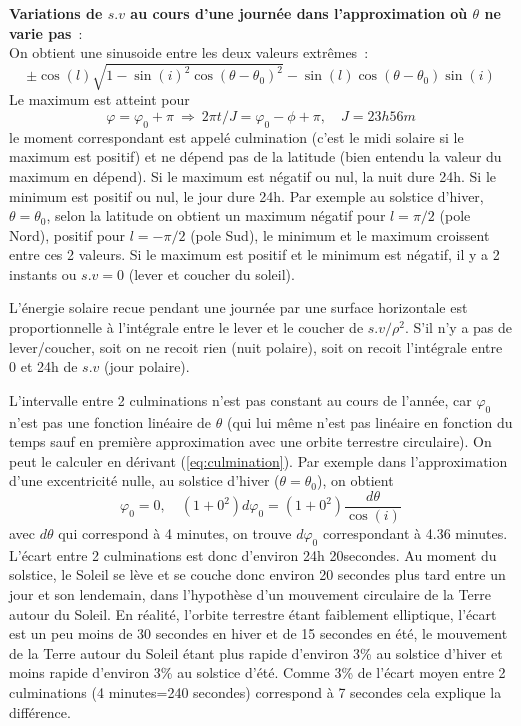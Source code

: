 \documentclass[a4paper,11pt]{article}
\begin{document}
{\bf Variations de $s.v$ au cours d'une journ\'ee dans l'approximation o\`u
$\theta$ ne varie pas}~:\\
On obtient une sinusoide entre les deux valeurs extr\^emes~:
\[ \pm \cos(l) \sqrt{1 - \sin(i)^2 \cos(\theta-\theta_0)^2 } -
 \sin(l) \cos(\theta-\theta_0)\sin(i) \]
Le maximum est atteint pour 
\[ \varphi=\varphi_0+ \pi \ \Rightarrow \ 
2 \pi t/J = \varphi_0 - \phi + \pi, \quad J=23h56m \]
le moment correspondant est appel\'e culmination (c'est le midi
solaire si le maximum est positif) et ne d\'epend pas de la latitude
(bien entendu la valeur du maximum en d\'epend).
Si le maximum est n\'egatif ou nul, la nuit dure 24h.
Si le minimum est positif ou nul, le jour dure 24h.
Par exemple au solstice d'hiver, $\theta=\theta_0$, selon la latitude
on obtient un maximum n\'egatif pour $l=\pi/2$ (pole Nord), positif 
pour $l=-\pi/2$ (pole Sud), le minimum et le maximum croissent 
entre ces 2 valeurs.
Si le maximum est positif et le minimum est n\'egatif, il y a
2 instants ou $s.v=0$ (lever et coucher du soleil).

L'\'energie solaire recue pendant une journ\'ee par une surface
horizontale est proportionnelle \`a l'int\'egrale entre le lever
et le coucher de $s.v/\rho^2$. S'il n'y a pas de lever/coucher, 
soit on ne recoit rien (nuit polaire),
soit on recoit l'int\'egrale entre 0 et 24h de $s.v$ (jour polaire).

L'intervalle entre 2 culminations n'est pas constant au cours de
l'ann\'ee, car $\varphi_0$ n'est pas une fonction lin\'eaire de
$\theta$ (qui lui m\^eme n'est pas lin\'eaire en fonction du temps
sauf en premi\`ere approximation avec une orbite terrestre
circulaire). On peut le calculer en d\'erivant (\ref{eq:culmination}).
Par exemple dans l'approximation d'une excentricit\'e nulle,
au solstice d'hiver ($\theta=\theta_0$), on obtient
\[ \varphi_0= 0, \quad (1+0^2) d\varphi_0 = (1+0^2)\frac{d\theta} {\cos(i)} \]
avec $d\theta$ qui correspond \`a 4 minutes, on trouve $d\varphi_0$
correspondant \`a 4.36 minutes.
L'\'ecart entre 2 culminations
est donc d'environ 24h 20secondes. 
Au moment du solstice, le Soleil se l\`eve et se couche donc environ
20 secondes plus tard entre un jour et son lendemain, dans 
l'hypothèse d'un mouvement circulaire de la Terre autour du Soleil. 
En réalité, l'orbite terrestre étant faiblement elliptique,
l'écart est un peu moins de 30 secondes en hiver et de 15 secondes en été, 
le mouvement de la Terre autour du Soleil étant plus rapide d'environ
3\% au solstice d'hiver et moins rapide d'environ 3\% au
solstice d'été. Comme 3\%
de l'écart moyen entre 2 culminations (4 minutes=240 secondes) 
correspond à 7 secondes cela explique la différence.
\end{document}
